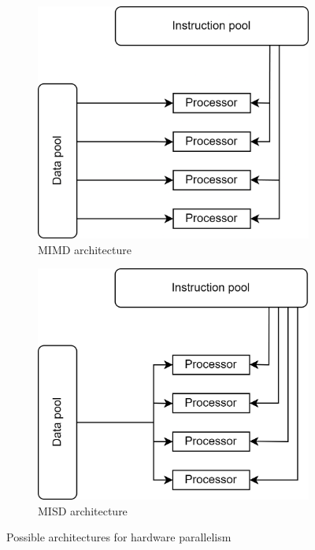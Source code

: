 \begin{figure}[H]
    \centering
    \begin{subfigure}{0.49\textwidth}
        \centering
        \includegraphics[width=0.6\linewidth]{images/mimd.png} 
        \caption{MIMD architecture}
    \end{subfigure}
    \begin{subfigure}{0.49\textwidth}
        \centering
        \includegraphics[width=0.6\linewidth]{images/misd.png}
        \caption{MISD architecture}
    \end{subfigure}
    \caption{Possible architectures for hardware parallelism}
\end{figure}
